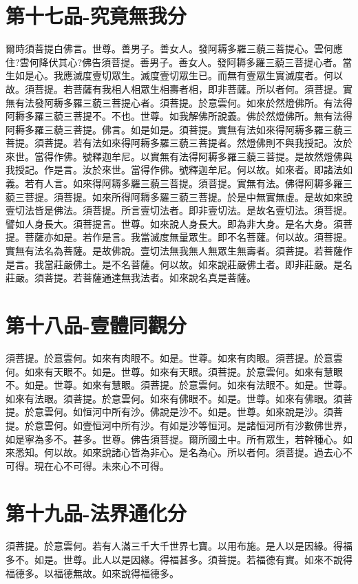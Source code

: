 \documentclass[a6paper, 22pt, twocolumn]{cvertbook}
\begin{document}
\chapter{第十七品-究竟無我分}
\large 爾時須菩提白佛言。世尊。善男子。善女人。發阿耨多羅三藐三菩提心。雲何應住?雲何降伏其心?佛告須菩提。善男子。善女人。發阿耨多羅三藐三菩提心者。當生如是心。我應滅度壹切眾生。滅度壹切眾生已。而無有壹眾生實滅度者。何以故。須菩提。若菩薩有我相人相眾生相壽者相，即非菩薩。所以者何。須菩提。實無有法發阿耨多羅三藐三菩提心者。須菩提。於意雲何。如來於然燈佛所。有法得阿耨多羅三藐三菩提不。不也。世尊。如我解佛所說義。佛於然燈佛所。無有法得阿耨多羅三藐三菩提。佛言。如是如是。須菩提。實無有法如來得阿耨多羅三藐三菩提。須菩提。若有法如來得阿耨多羅三藐三菩提者。然燈佛則不與我授記。汝於來世。當得作佛。號釋迦牟尼。以實無有法得阿耨多羅三藐三菩提。是故然燈佛與我授記。作是言。汝於來世。當得作佛。號釋迦牟尼。何以故。如來者。即諸法如義。若有人言。如來得阿耨多羅三藐三菩提。須菩提。實無有法。佛得阿耨多羅三藐三菩提。須菩提。如來所得阿耨多羅三藐三菩提。於是中無實無虛。是故如來說壹切法皆是佛法。須菩提。所言壹切法者。即非壹切法。是故名壹切法。須菩提。譬如人身長大。須菩提言。世尊。如來說人身長大。即為非大身。是名大身。須菩提。菩薩亦如是。若作是言。我當滅度無量眾生。即不名菩薩。何以故。須菩提。實無有法名為菩薩。是故佛說。壹切法無我無人無眾生無壽者。須菩提。若菩薩作是言。我當莊嚴佛土。是不名菩薩。何以故。如來說莊嚴佛土者。即非莊嚴。是名莊嚴。須菩提。若菩薩通達無我法者。如來說名真是菩薩。
\chapter{第十八品-壹體同觀分}
\large 須菩提。於意雲何。如來有肉眼不。如是。世尊。如來有肉眼。須菩提。於意雲何。如來有天眼不。如是。世尊。如來有天眼。須菩提。於意雲何。如來有慧眼不。如是。世尊。如來有慧眼。須菩提。於意雲何。如來有法眼不。如是。世尊。如來有法眼。須菩提。於意雲何。如來有佛眼不。如是。世尊。如來有佛眼。須菩提。於意雲何。如恒河中所有沙。佛說是沙不。如是。世尊。如來說是沙。須菩提。於意雲何。如壹恒河中所有沙。有如是沙等恒河。是諸恒河所有沙數佛世界，如是寧為多不。甚多。世尊。佛告須菩提。爾所國土中。所有眾生，若幹種心。如來悉知。何以故。如來說諸心皆為非心。是名為心。所以者何。須菩提。過去心不可得。現在心不可得。未來心不可得。
\chapter{第十九品-法界通化分}
\large 須菩提。於意雲何。若有人滿三千大千世界七寶。以用布施。是人以是因緣。得福多不。如是。世尊。此人以是因緣。得福甚多。須菩提。若福德有實。如來不說得福德多。以福德無故。如來說得福德多。
\end{document}
